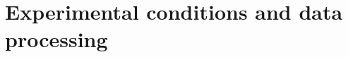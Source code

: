 \documentclass[a4paper]{beamer}
\begin{document}


\section{Experimental conditions and data processing}
\end{document}
